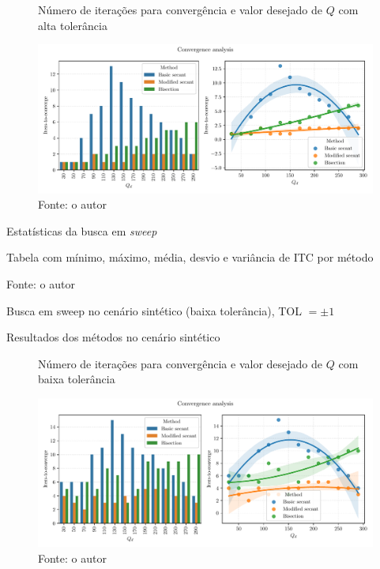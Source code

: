 \begin{frame}{}

\begin{figure}[H]
    \centering
    \caption{Número de iterações para convergência e valor desejado de $Q$ com alta tolerância}
    \includegraphics[width=.8\textwidth]{fig/conv-analysis-no-drop.pdf}
     \caption*{Fonte: o autor}
    \label{fig-itc-q-trend}
\end{figure}
    
\end{frame}

\begin{frame}{Estatísticas da busca em \textit{sweep}}

\begin{table}[H]
    \centering
    \caption{Tabela com mínimo, máximo, média, desvio e variância de ITC por método}
        
    \caption*{Fonte: o autor}
    \label{tab-stats-sweep}
\end{table}
    
\end{frame}


\begin{frame}[standout]

Busca em sweep no cenário sintético (baixa tolerância), TOL $ = \pm 1$
    
\end{frame}



\begin{frame}{Resultados dos métodos no cenário sintético}
\begin{figure}[H]
    \centering
    \caption{Número de iterações para convergência e valor desejado de $Q$ com baixa tolerância}
    \includegraphics[width=.8\textwidth]{fig/conv-analysis-no-drop-low-tol.pdf}
     \caption*{Fonte: o autor}
    \label{fig-itc-q-trend-low-tol}
\end{figure}

    
\end{frame}

